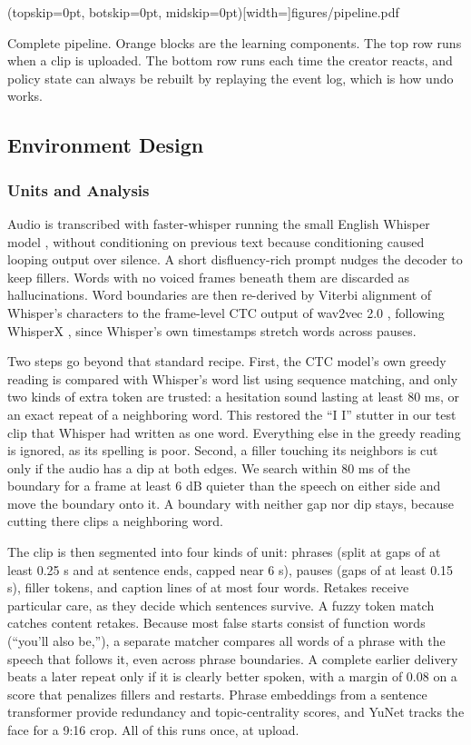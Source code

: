 \documentclass{ieeeaccess}
\begin{document}
\Figure[t!](topskip=0pt, botskip=0pt, midskip=0pt)[width=\textwidth]{figures/pipeline.pdf}
{\parbox[t]{0.91\textwidth}{\raggedright Complete pipeline. Orange blocks are the learning components. The top row runs when a clip is uploaded. The bottom row runs each time the creator reacts, and policy state can always be rebuilt by replaying the event log, which is how undo works.}\label{fig:pipeline}}

\subsection{Environment Design}

\subsubsection{Units and Analysis}
Audio is transcribed with faster-whisper running the small English Whisper model \cite{radford2023}, without conditioning on previous text because conditioning caused looping output over silence. A short disfluency-rich prompt nudges the decoder to keep fillers. Words with no voiced frames beneath them are discarded as hallucinations. Word boundaries are then re-derived by Viterbi alignment of Whisper's characters to the frame-level CTC output of wav2vec 2.0 \cite{baevski2020}, following WhisperX \cite{bain2023}, since Whisper's own timestamps stretch words across pauses.

Two steps go beyond that standard recipe. First, the CTC model's own greedy reading is compared with Whisper's word list using sequence matching, and only two kinds of extra token are trusted: a hesitation sound lasting at least 80 ms, or an exact repeat of a neighboring word. This restored the ``I I'' stutter in our test clip that Whisper had written as one word. Everything else in the greedy reading is ignored, as its spelling is poor. Second, a filler touching its neighbors is cut only if the audio has a dip at both edges. We search within 80 ms of the boundary for a frame at least 6 dB quieter than the speech on either side and move the boundary onto it. A boundary with neither gap nor dip stays, because cutting there clips a neighboring word.

The clip is then segmented into four kinds of unit: phrases (split at gaps of at least 0.25 s and at sentence ends, capped near 6 s), pauses (gaps of at least 0.15 s), filler tokens, and caption lines of at most four words. Retakes receive particular care, as they decide which sentences survive. A fuzzy token match catches content retakes. Because most false starts consist of function words (``you'll also be,''), a separate matcher compares all words of a phrase with the speech that follows it, even across phrase boundaries. A complete earlier delivery beats a later repeat only if it is clearly better spoken, with a margin of 0.08 on a score that penalizes fillers and restarts. Phrase embeddings from a sentence transformer \cite{reimers2019} provide redundancy and topic-centrality scores, and YuNet \cite{wu2023yunet} tracks the face for a 9:16 crop. All of this runs once, at upload.
\end{document}
